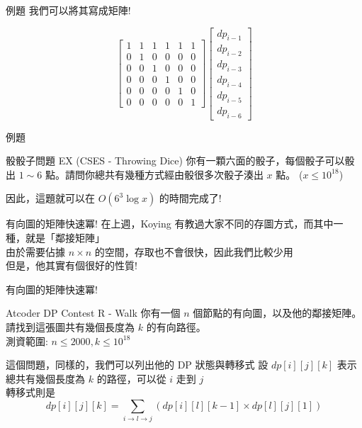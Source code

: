 \documentclass[aspectratio=169]{beamer}
\begin{document}
\begin{frame}[fragile]{例題}
    我們可以將其寫成矩陣!
    
    $$\begin{bmatrix} 1 & 1 & 1 & 1 & 1 & 1 \\
                      0 & 1 & 0 & 0 & 0 & 0 \\
                      0 & 0 & 1 & 0 & 0 & 0 \\
                      0 & 0 & 0 & 1 & 0 & 0 \\
                      0 & 0 & 0 & 0 & 1 & 0 \\
                      0 & 0 & 0 & 0 & 0 & 1
    \end{bmatrix} 
    \begin{bmatrix}   dp_{i-1} \\
                      dp_{i-2} \\
                      dp_{i-3} \\
                      dp_{i-4} \\
                      dp_{i-5} \\
                      dp_{i-6}
    \end{bmatrix}$$
\end{frame}

\begin{frame}[fragile]{例題}
    \begin{block}{骰骰子問題 EX (CSES - Throwing Dice)}
        你有一顆六面的骰子，每個骰子可以骰出 $1 \sim 6$ 點。請問你總共有幾種方式經由骰很多次骰子湊出 $x$ 點。 ($x \le 10^{18}$)
    \end{block} 
    因此，這題就可以在 $O(6^3 \log x)$ 的時間完成了!
\end{frame}

\begin{frame}[fragile]{有向圖的矩陣快速冪!}
    在上週，Koying 有教過大家不同的存圖方式，而其中一種，就是「鄰接矩陣」 \\
    由於需要佔據 $n \times n$ 的空間，存取也不會很快，因此我們比較少用 \\
    但是，他其實有個很好的性質!
\end{frame}

\begin{frame}[fragile]{有向圖的矩陣快速冪!}
    \begin{block}{Atcoder DP Contest R - Walk}
        你有一個 $n$ 個節點的有向圖，以及他的鄰接矩陣。請找到這張圖共有幾個長度為 $k$ 的有向路徑。\\ 
        \vspace{5mm}
        測資範圍: $n \le 2000, k \le 10^{18}$
    \end{block}
    這個問題，同樣的，我們可以列出他的 DP 狀態與轉移式 \pause
    設 $dp[i][j][k]$ 表示總共有幾個長度為 $k$ 的路徑，可以從 $i$ 走到 $j$ \\
    轉移式則是 
        $$dp[i][j][k] = \sum_{i \rightarrow l \rightarrow j}(dp[i][l][k-1] \times dp[l][j][1])$$
\end{frame}
\end{document}
